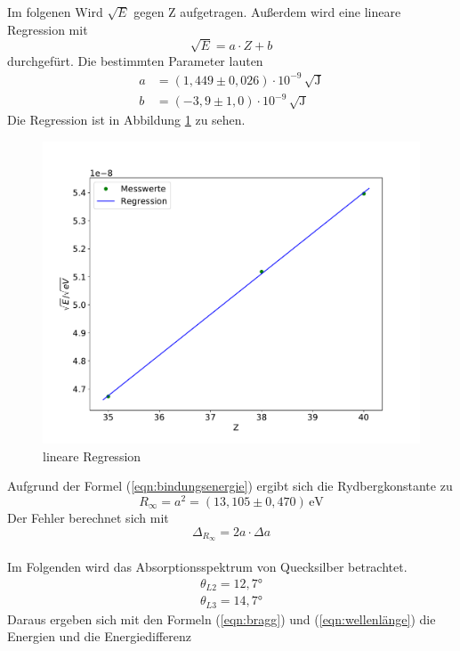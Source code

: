 Im folgenen Wird $\sqrt{E}$ gegen Z aufgetragen.
Außerdem wird eine lineare Regression mit
\begin{equation*}
  \sqrt{E} = a\cdot Z +b
\end{equation*}
durchgefürt.
Die bestimmten Parameter lauten
\begin{align*}
  a &= (1,449 \pm 0,026)\cdot 10^{-9}\, \mathrm{\sqrt{J}}\\
  b &= (-3,9\pm 1,0)       \cdot 10^{-9}\, \mathrm{\sqrt{J}}
\end{align*}
Die Regression ist in Abbildung \ref{fig:Z} zu sehen.
\begin{figure}
  \centering
  \includegraphics[width=\textwidth]{Z.pdf}
  \caption{lineare Regression}
  \label{fig:Z}
\end{figure}
Aufgrund der Formel (\ref{eqn:bindungsenergie}) ergibt sich die Rydbergkonstante zu
\begin{equation*}
  R_{\infty} = a^2 = (13,105 \pm 0,470)\,\mathrm{eV}
\end{equation*}
Der Fehler berechnet sich mit
\begin{equation*}
  \Delta_{R_{\infty}} = 2a\cdot\Delta a
\end{equation*}
\\
Im Folgenden wird das Absorptionsspektrum von Quecksilber betrachtet.
\begin{align*}
\theta_{L2} = 12,7°\\
  \theta_{L3} = 14,7°
\end{align*}
Daraus ergeben sich mit den Formeln (\ref{eqn:bragg})
und (\ref{eqn:wellenlänge}) die Energien und die Energiedifferenz
